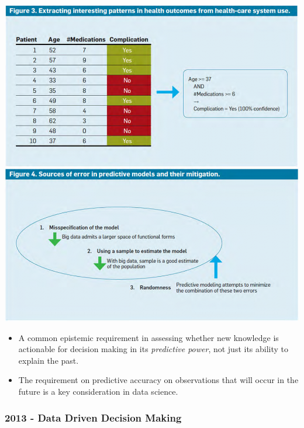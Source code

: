 \documentclass[a4paper]{article}
\begin{document}
			\begin{minipage}[c]{0.45\textwidth}
				\centering
				\includegraphics[width=\textwidth]{img/sw01/pred_mod.png}
			\end{minipage}
			\hfill
			\begin{minipage}[c]{0.45\textwidth}
				\begin{itemize}
					\item A common epistemic requirement in assessing whether new knowledge is actionable for decision making in its \textit{predictive power}, not just its ability to explain the past.
					\item The requirement on predictive accuracy on observations that will occur in the future is a key consideration in data science.
				\end{itemize}
			\end{minipage}
		
			\subsubsection{2013 - Data Driven Decision Making}
			
\end{document}
